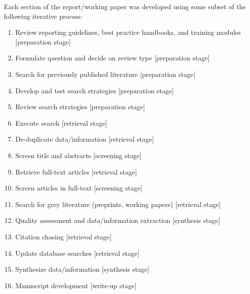 \documentclass[11pt]{article}
\begin{document}
Each section of the report/working paper was developed using some subset of the following iterative process\autocite{tsafnat14}:
\begin{enumerate}
    \item Review reporting guidelines, best practice handbooks, and training modules [preparation stage]
    \item Formulate question and decide on review type [preparation stage]
    \item Search for previously published literature [preparation stage]
    \item Develop and test search strategies [preparation stage]
    \item Review search strategies [preparation stage]
    \item Execute search [retrieval stage]
    \item De-duplicate data/information [retrieval stage]
    \item Screen title and abstracts [screening stage]
    \item Retrieve full-text articles [retrieval stage]
    \item Screen articles in full-text [screening stage]
    \item Search for grey literature (preprints, working papers) [retrieval stage]
    \item Quality assessment and data/information extraction [synthesis stage]
    \item Citation chasing [retrieval stage]
    \item Update database searches [retrieval stage]
    \item Synthesize data/information [synthesis stage]
    \item Manuscript development [write-up stage]
\end{enumerate}
\end{document}
